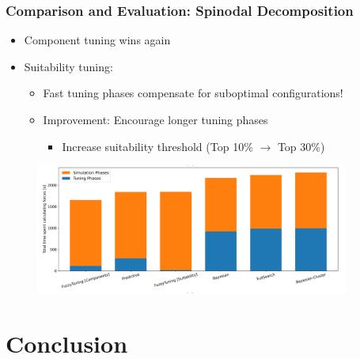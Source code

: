 \documentclass[
	10pt,
	t		%
]{beamer}
\begin{document}
\begin{frame}
	\frametitle{Comparison and Evaluation: Spinodal Decomposition}
	
	\begin{itemize}
		\item Component tuning wins again
		\item Suitability tuning:
		      \begin{itemize}
			      \item Fast tuning phases compensate for suboptimal configurations!
			      \item Improvement: Encourage longer tuning phases
			            \begin{itemize}
				            \item Increase suitability threshold {\scriptsize (Top 10\% $\rightarrow$ Top 30\%)}
			            \end{itemize}
		      \end{itemize}
	\end{itemize}
	
	\begin{figure}
		\centering
		\includegraphics[width=0.92\textwidth]{figures/spinodal-total.png}
	\end{figure}
\end{frame}


\section{Conclusion}
\end{document}
